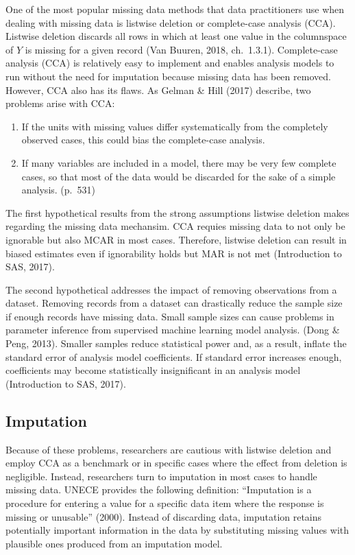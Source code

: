 \documentclass[12pt,oneside]{chicagocapstone}
\providecommand{\tightlist}{%
  \setlength{\itemsep}{0pt}\setlength{\parskip}{0pt}}
\begin{document}
One of the most popular missing data methods that data practitioners use
when dealing with missing data is listwise deletion or complete-case
analysis (CCA). Listwise deletion discards all rows in which at least
one value in the columnspace of \(Y\) is missing for a given record (Van
Buuren, 2018, ch.~1.3.1). Complete-case analysis (CCA) is relatively
easy to implement and enables analysis models to run without the need
for imputation because missing data has been removed. However, CCA also
has its flaws. As Gelman \& Hill (2017) describe, two problems arise
with CCA:
\begin{enumerate}
\def\labelenumi{\arabic{enumi}.}
\tightlist
\item
  If the units with missing values differ systematically from the
  completely observed cases, this could bias the complete-case analysis.
\item
  If many variables are included in a model, there may be very few
  complete cases, so that most of the data would be discarded for the
  sake of a simple analysis. (p.~531)
\end{enumerate}
The first hypothetical results from the strong assumptions listwise
deletion makes regarding the missing data mechansim. CCA requies missing
data to not only be ignorable but also MCAR in most cases. Therefore,
listwise deletion can result in biased estimates even if ignorability
holds but MAR is not met (Introduction to SAS, 2017).

The second hypothetical addresses the impact of removing observations
from a dataset. Removing records from a dataset can drastically reduce
the sample size if enough records have missing data. Small sample sizes
can cause problems in parameter inference from supervised machine
learning model analysis. (Dong \& Peng, 2013). Smaller samples reduce
statistical power and, as a result, inflate the standard error of
analysis model coefficients. If standard error increases enough,
coefficients may become statistically insignificant in an analysis model
(Introduction to SAS, 2017).

\subsection*{Imputation}\label{background-imputation}

Because of these problems, researchers are cautious with listwise
deletion and employ CCA as a benchmark or in specific cases where the
effect from deletion is negligible. Instead, researchers turn to
imputation in most cases to handle missing data. UNECE provides the
following definition: ``Imputation is a procedure for entering a value
for a specific data item where the response is missing or unusable''
(2000). Instead of discarding data, imputation retains potentially
important information in the data by substituting missing values with
plausible ones produced from an imputation model.
\end{document}
